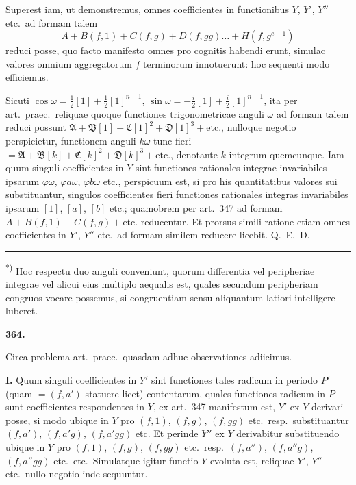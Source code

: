 \documentclass[12pt,a4paper]{article}
\theoremstyle{plain}
\theoremstyle{definition}
\theoremstyle{remark}
\begin{document}
Superest iam, ut demonstremus, omnes coefficientes in functionibus $Y$, $Y'$, $Y''$ etc.\ ad formam talem
\[A + B(f,1) + C(f,g) + D(f,gg) \ldots + H(f,g^{e-1})\]
reduci posse, quo facto manifesto omnes pro cognitis habendi erunt, simulac valores omnium aggregatorum $f$ terminorum innotuerunt: hoc sequenti modo efficiemus.

Sicuti $\cos\omega = \tfrac{1}{2}[1] + \tfrac{1}{2}[1]^{n-1}$, $\sin\omega = -\tfrac{i}{2}[1] + \tfrac{i}{2}[1]^{n-1}$, ita per art.\ praec.\ reliquae quoque functiones trigonometricae anguli $\omega$ ad formam talem reduci possunt $\mathfrak{A} + \mathfrak{B}[1] + \mathfrak{C}[1]^2 + \mathfrak{D}[1]^3 + \text{etc.}$, nulloque negotio perspicietur, functionem anguli $k\omega$ tunc fieri $= \mathfrak{A} + \mathfrak{B}[k] + \mathfrak{C}[k]^2 + \mathfrak{D}[k]^3 + \text{etc.}$, denotante $k$ integrum quemcunque. Iam quum singuli coefficientes in $Y$ sint functiones rationales integrae invariabiles ipsarum $\varphi\omega$, $\varphi a\omega$, $\varphi b\omega$ etc., perspicuum est, si pro his quantitatibus valores sui substituantur, singulos coefficientes fieri functiones rationales integras invariabiles ipsarum $[1]$, $[a]$, $[b]$ etc.; quamobrem per art.\ 347 ad formam $A + B(f,1) + C(f,g) + \text{etc.}$ reducentur. Et prorsus simili ratione etiam omnes coefficientes in $Y'$, $Y''$ etc.\ ad formam similem reducere licebit. \hfill Q.\ E.\ D.

\vspace{0.5em}
\noindent\rule{4cm}{0.4pt}

\noindent\textsuperscript{*)} Hoc respectu duo anguli conveniunt, quorum differentia vel peripheriae integrae vel alicui eius multiplo aequalis est, quales secundum peripheriam congruos vocare possemus, si congruentiam sensu aliquantum latiori intelligere luberet.

\vspace{1em}

\begin{center}
\textbf{364.}
\end{center}

Circa problema art.\ praec.\ quasdam adhuc observationes adiicimus.

\textbf{I.} Quum singuli coefficientes in $Y'$ sint functiones tales radicum in periodo $P'$ (quam $= (f,a')$ statuere licet) contentarum, quales functiones radicum in $P$ sunt coefficientes respondentes in $Y$, ex art.\ 347 manifestum est, $Y'$ ex $Y$ derivari posse, si modo ubique in $Y$ pro $(f,1)$, $(f,g)$, $(f,gg)$ etc.\ resp.\ substituantur $(f,a')$, $(f,a'g)$, $(f,a'gg)$ etc. Et perinde $Y''$ ex $Y$ derivabitur substituendo ubique in $Y$ pro $(f,1)$, $(f,g)$, $(f,gg)$ etc.\ resp.\ $(f,a'')$, $(f,a''g)$, $(f,a''gg)$ etc.\ etc.\ Simulatque igitur functio $Y$ evoluta est, reliquae $Y'$, $Y''$ etc.\ nullo negotio inde sequuntur.
\end{document}

